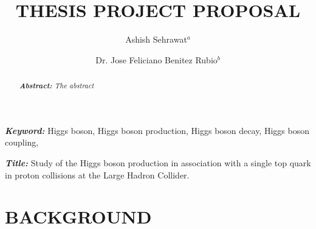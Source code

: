 \documentclass[final,3p]{CSP}
\begin{document}
\begin{frontmatter}

\title{THESIS PROJECT PROPOSAL}

\author[]{Ashish Sehrawat$^a$}
\author[]{Dr. Jose Feliciano Benitez Rubio$^b$}


\address[mymainaddress]{Universidad de Sonora}

\begin{keyword}\rm
\begin{adjustwidth}{2cm}{2cm}{\itshape\textbf{Keyword:}}  
Higgs boson, Higgs boson production, Higgs boson decay, Higgs boson coupling, 
\end{adjustwidth}
\end{keyword}


\begin{keyword}\rm
\begin{adjustwidth}{2cm}{2cm}{\itshape\textbf{Title:}}  
Study of the Higgs boson production in association with a single top quark in proton collisions at the Large Hadron Collider.
\end{adjustwidth}
\end{keyword}

\begin{abstract}\rm
\itshape\textbf{Abstract:}
The abstract
\end{abstract}


\end{frontmatter}

\section{BACKGROUND}
\end{document}
